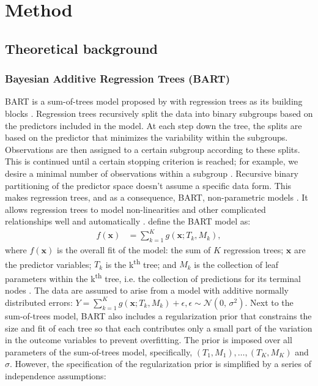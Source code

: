 \documentclass[3p,12pt,a4paper]{elsarticle}
\begin{document}
\section{Method}
\subsection{Theoretical background}
\subsubsection{Bayesian Additive Regression Trees (BART)} \label{sec:bart}
BART is a sum-of-trees model proposed by \citet{chipman2010} with regression trees as its building blocks \citep{chipman2010, hill2020, james2021}. Regression trees recursively split the data into binary subgroups based on the predictors included in the model. At each step down the tree, the splits are based on the predictor that minimizes the variability within the subgroups. Observations are then assigned to a certain subgroup according to these splits. This is continued until a certain stopping criterion is reached; for example, we desire a minimal number of observations within a subgroup \citep{hastie2017, james2021, salditt2023, breiman1984}. Recursive binary partitioning of the predictor space doesn't assume a specific data form. This makes regression trees, and as a consequence, BART, non-parametric models \citep{hastie2017, james2021, salditt2023, breiman1984}. It allows regression trees to model non-linearities and other complicated relationships well and automatically \citep{hill2020, burgette2010}.
\citet{chipman2010} define the BART model as:
\begin{align}
\label{eq:BART}
f(\textbf{x}) &= \sum^{K}_{k=1}g(\textbf{x}; T_{k}, M_{k}),
\end{align} where $f(\mathbf{x})$ is the overall fit of the model: the sum of $K$ regression trees; $\textbf{x}$ are the predictor variables; $T_{k}$ is the k\textsuperscript{th} tree; and $M_{k}$ is the collection of leaf parameters within the k\textsuperscript{th} tree, i.e. the collection of predictions for its terminal nodes \citep{chipman1998, chipman2006, chipman2010, hill2020, james2021}. The data are assumed to arise from a model with additive normally distributed errors: $Y = \sum^{K}_{k=1}g(\textbf{x}; T_{k}, M_{k}) + \epsilon, \epsilon \sim \mathcal{N}(0,\,\sigma^{2})$.
Next to the sum-of-trees model, BART also includes a regularization prior that constrains the size and fit of each tree so that each contributes only a small part of the variation in the outcome variables to prevent overfitting. The prior is imposed over all parameters of the sum-of-trees model, specifically, $(T_1, M_1), \dots, (T_K, M_K)$ and $\sigma$. However, the specification of the regularization prior is simplified by a series of independence assumptions: 
\end{document}
